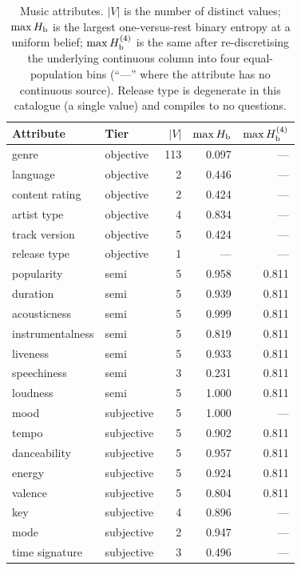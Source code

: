 \begin{table}[t]
\caption{Music attributes. $|V|$ is the number of distinct values;
$\max H_{\mathrm{b}}$ is the largest one-versus-rest binary entropy at a uniform belief;
$\max H_{\mathrm{b}}^{(4)}$ is the same after re-discretising the underlying continuous
column into four equal-population bins (``---'' where the attribute has no
continuous source). Release type is degenerate in this catalogue (a single
value) and compiles to no questions.}
\label{tab:attributes}
\centering
\footnotesize
\begin{tabular}{@{}llrrr@{}}
\toprule
\textbf{Attribute} & \textbf{Tier} & \textbf{$|V|$} &
\textbf{$\max H_{\mathrm{b}}$} & \textbf{$\max H_{\mathrm{b}}^{(4)}$} \\
\midrule
genre            & objective & 113 & 0.097 & --- \\
language         & objective & 2   & 0.446 & --- \\
content rating   & objective & 2   & 0.424 & --- \\
artist type      & objective & 4   & 0.834 & --- \\
track version    & objective & 5   & 0.424 & --- \\
release type     & objective & 1   & ---   & --- \\
\midrule
popularity       & semi & 5 & 0.958 & 0.811 \\
duration         & semi & 5 & 0.939 & 0.811 \\
acousticness     & semi & 5 & 0.999 & 0.811 \\
instrumentalness & semi & 5 & 0.819 & 0.811 \\
liveness         & semi & 5 & 0.933 & 0.811 \\
speechiness      & semi & 3 & 0.231 & 0.811 \\
loudness         & semi & 5 & 1.000 & 0.811 \\
\midrule
mood             & subjective & 5 & 1.000 & --- \\
tempo            & subjective & 5 & 0.902 & 0.811 \\
danceability     & subjective & 5 & 0.957 & 0.811 \\
energy           & subjective & 5 & 0.924 & 0.811 \\
valence          & subjective & 5 & 0.804 & 0.811 \\
key              & subjective & 4 & 0.896 & --- \\
mode             & subjective & 2 & 0.947 & --- \\
time signature   & subjective & 3 & 0.496 & --- \\
\bottomrule
\end{tabular}
\end{table}

